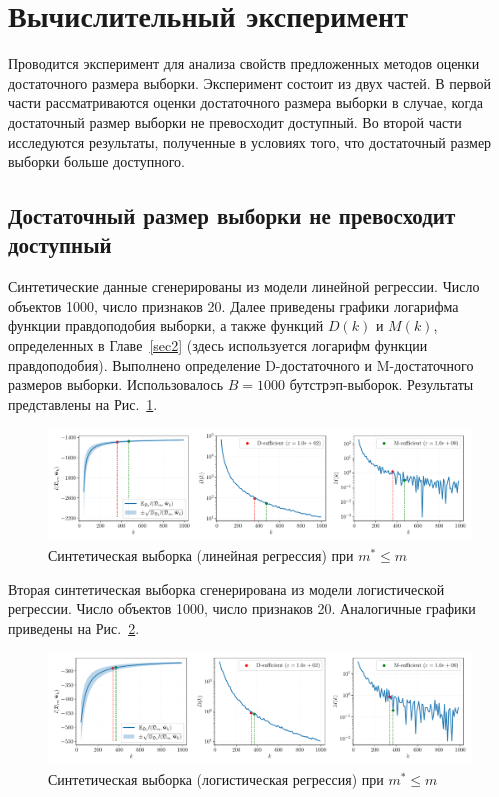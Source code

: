 \section{Вычислительный эксперимент}\label{sec4}

Проводится эксперимент для анализа свойств предложенных методов оценки достаточного размера выборки. Эксперимент состоит из двух частей. В первой части рассматриваются оценки достаточного размера выборки в случае, когда достаточный размер выборки не превосходит доступный. Во второй части исследуются результаты, полученные в условиях того, что достаточный размер выборки больше доступного.

\subsection{Достаточный размер выборки не превосходит доступный}

Синтетические данные сгенерированы из модели линейной регрессии. Число объектов 1000, число признаков 20. Далее приведены графики логарифма функции правдоподобия выборки, а также функций $D(k)$ и $M(k)$, определенных в Главе~\ref{sec2} (здесь используется логарифм функции правдоподобия). Выполнено определение D-достаточного и M-достаточного размеров выборки. Использовалось $B=1000$ бутстрэп-выборок. Результаты представлены на Рис.~\ref{synthetic-regression-sufficient}.

\begin{figure}[h!]
    \centering
    \includegraphics[width=\textwidth]{figures/synthetic-regression-sufficient.pdf}
    \caption{Синтетическая выборка (линейная регрессия) при $m^* \leqslant m$}
    \label{synthetic-regression-sufficient}
\end{figure}

Вторая синтетическая выборка сгенерирована из модели логистической регрессии. Число объектов 1000, число признаков 20. Аналогичные графики приведены на Рис.~\ref{synthetic-classification-sufficient}.

\begin{figure}[h!]
    \centering
    \includegraphics[width=\textwidth]{figures/synthetic-classification-sufficient.pdf}
    \caption{Синтетическая выборка (логистическая регрессия) при $m^* \leqslant m$}
    \label{synthetic-classification-sufficient}
\end{figure}

